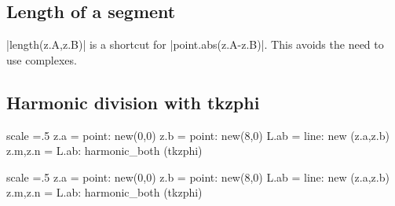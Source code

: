 \subsection{Length of a segment} %
\label{sub:length_of_a_segment}
|length(z.A,z.B)| is a shortcut for |point.abs(z.A-z.B)|. This avoids the need to use complexes.



\subsection{Harmonic division with tkzphi } %
\label{sub:harmonic_division_with_tkzphi}
\begin{tkzexample}[latex=0cm,small,code only]
\begin{tkzelements}
   scale =.5
   z.a = point: new(0,0)
   z.b = point: new(8,0)
   L.ab = line: new (z.a,z.b)
   z.m,z.n = L.ab: harmonic_both (tkzphi)
\end{tkzelements}
\end{tkzexample}


\begin{tkzelements}
   scale =.5
   z.a = point: new(0,0)
   z.b = point: new(8,0)
   L.ab = line: new (z.a,z.b)
   z.m,z.n = L.ab: harmonic_both (tkzphi)
\end{tkzelements}
\hspace*{\fill}
 \hspace*{\fill}

